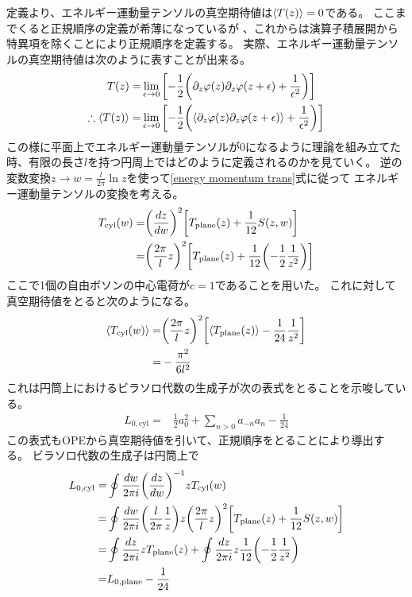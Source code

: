 \documentclass[11pt, dvipdfmx]{article}
\numberwithin{equation}{section}
\begin{document}
定義より、エネルギー運動量テンソルの真空期待値は$\ev{T(z)}=0$である。
ここまでくると正規順序の定義が希薄になっているが
、これからは演算子積展開から特異項を除くことにより正規順序を定義する。
実際、エネルギー運動量テンソルの真空期待値は次のように表すことが出来る。
\begin{align}
    T(z)=&\lim_{\epsilon \to 0}\qty[-\frac{1}{2}\qty(\partial_z \varphi(z)\partial_z \varphi(z+\epsilon) + \frac{1}{\epsilon^2})]\\
\therefore \ev{T(z)}=&\lim_{\epsilon \to 0}\qty[-\frac{1}{2}\qty(\ev{\partial_z \varphi(z)\partial_z \varphi(z+\epsilon)} + \frac{1}{\epsilon^2})]
\end{align}
この様に平面上でエネルギー運動量テンソルが0になるように理論を組み立てた時、有限の長さ$l$を持つ円周上ではどのように定義されるのかを見ていく。
逆の変数変換$z\rightarrow w=\frac{l}{2\pi}\ln z$を使って\eqref{energy momentum trans}式に従って
エネルギー運動量テンソルの変換を考える。
\begin{align}
    T_{\text{cyl}}(w)=&\qty(\frac{dz}{dw})^{2}\qty[T_{\text{plane}}(z) + \frac{1}{12}S(z,w)]\\
    =&\qty(\frac{2\pi}{l}z)^{2}\qty[T_{\text{plane}}(z)  + \frac{1}{12}\qty(-\frac{1}{2}\frac{1}{z^2})]\\
\end{align}
ここで1個の自由ボソンの中心電荷が$c=1$であることを用いた。
これに対して真空期待値をとると次のようになる。
\begin{align}
    \ev{T_{\text{cyl}}(w)}=&\qty(\frac{2\pi}{l}z)^{2}\qty[\ev{T_{\text{plane}}(z)}  - \frac{1}{24}\frac{1}{z^2}]\\
    =& - \frac{\pi^2}{6 l^2}
\end{align}
これは円筒上におけるビラソロ代数の生成子が次の表式をとることを示唆している。
\begin{align}
    L_{0,\text{cyl}}=& \frac{1}{2}a_0^2 + \sum_{n>0} a_{-n} a_n - \frac{1}{24}
\end{align}
この表式もOPEから真空期待値を引いて、正規順序をとることにより導出する。
    ビラソロ代数の生成子は円筒上で
    \begin{align}
        L_{0,\text{cyl}}=& \oint \frac{dw}{2\pi i} \qty(\frac{dz}{dw})^{-1} z T_{\text{cyl}}(w)\notag\\
        =& \oint \frac{dw}{2\pi i} \qty(\frac{l}{2\pi}\frac{1}{z}) z \qty(\frac{2\pi}{l}z)^{2}\qty[T_{\text{plane}}(z) + \frac{1}{12}S(z,w)]\notag\\
        =& \oint \frac{dz}{2\pi i} z T_{\text{plane}}(z) + \oint \frac{dz}{2\pi i} z \frac{1}{12}\qty(-\frac{1}{2}\frac{1}{z^2})\notag\\
        =& L_{0,\text{plane}} - \frac{1}{24}
        \end{align}
\end{document}
